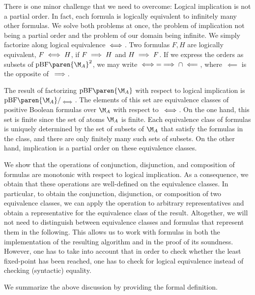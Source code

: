 \documentclass[../../diss.tex]{subfiles}
\begin{document}
There is one minor challenge that we need to overcome: Logical implication is not a partial order.
In fact, each formula is logically equivalent to infinitely many other formulas.
We solve both problems at once, the problem of implication not being a partial order and the problem of our domain being infinite.
We simply factorize along logical equivalence $\iff$.
Two formulas $F,H$ are logically equivalent, $F \iff H$, if $F \implies H$ and $H \implies F$.
If we express the orders as subsets of ${\pBF\paren{\nfatransmonoid{A}}}^2$, we may write $\iff = \implies \cap \impliedby$, where~$\impliedby$ is the opposite of~$\implies$.

The result of factorizing $\pBF\paren{\nfatransmonoid{A}}$ with respect to logical implication is $\pBF\paren{\nfatransmonoid{A}}/_{\lequiv}$.
The elements of this set are equivalence classes of positive Boolean formulas over $\nfatransmonoid{A}$ with respect to~$\iff$.
On the one hand, this set is finite since the set of atoms $\nfatransmonoid{A}$ is finite.
Each equivalence class of formulas is uniquely determined by the set of subsets of $\nfatransmonoid{A}$ that satisfy the formulas in the class, and there are only finitely many such sets of subsets.
On the other hand, implication is a partial order on these equivalence classes.

We show that the operations of conjunction, disjunction, and composition of formulas are monotonic with respect to logical implication.
As a consequence, we obtain that these operations are well-defined on the equivalence classes.
In particular, to obtain the conjunction, disjunction, or composition of two equivalence classes, we can apply the operation to arbitrary representatives and obtain a representative for the equivalence class of the result.
Altogether, we will not need to distinguish between equivalence classes and formulas that represent them in the following.
This allows us to work with formulas in both the implementation of the resulting algorithm and in the proof of its soundness.
However, one has to take into account that in order to check whether the least fixed-point has been reached, one has to check for logical equivalence instead of checking (syntactic) equality.

We summarize the above discussion by providing the formal definition.
\end{document}
